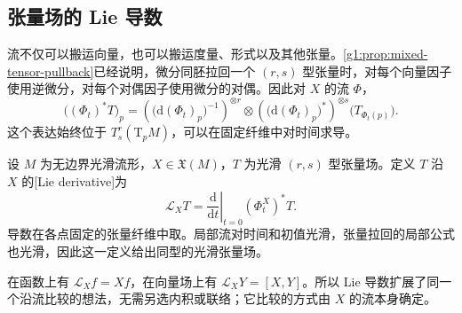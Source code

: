 \subsection{张量场的 Lie 导数}
\label{g1:subsec:1303:03}

流不仅可以搬运向量，也可以搬运度量、形式以及其他张量。\cref{g1:prop:mixed-tensor-pullback}已经说明，微分同胚拉回一个 \((r,s)\) 型张量时，对每个向量因子使用逆微分，对每个对偶因子使用微分的对偶。因此对 \(X\) 的流 \(\Phi\)，
\[
	\bigl((\Phi_t)^*T\bigr)_p
	=\left(\bigl(\mathrm{d}(\Phi_t)_p\bigr)^{-1}\right)^{\otimes r}
	\otimes\left(\bigl(\mathrm{d}(\Phi_t)_p\bigr)^*\right)^{\otimes s}
	\bigl(T_{\Phi_t(p)}\bigr).
\]
这个表达始终位于 \(T^r_s(\mathrm{T}_pM)\)，可以在固定纤维中对时间求导。

\begin{definition}
	\label{g1:def:lie-derivative-tensor}
	设 \(M\) 为无边界光滑流形，\(X\in\mathfrak X(M)\)，\(T\) 为光滑 \((r,s)\) 型张量场。定义 \(T\) 沿 \(X\) 的[Lie derivative]为
	\[
		\mathcal L_XT=\left.\frac{\mathrm{d}}{\mathrm{d}t}\right|_{t=0}(\Phi_t^X)^*T.
	\]
	导数在各点固定的张量纤维中取。局部流对时间和初值光滑，张量拉回的局部公式也光滑，因此这一定义给出同型的光滑张量场。
\end{definition}

在函数上有 \(\mathcal L_Xf=Xf\)，在向量场上有 \(\mathcal L_XY=[X,Y]\)。所以 Lie 导数扩展了同一个沿流比较的想法，无需另选内积或联络；它比较的方式由 \(X\) 的流本身确定。

